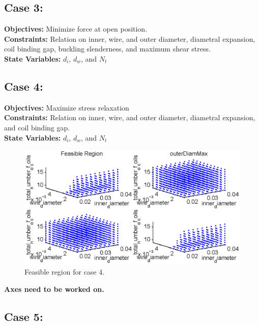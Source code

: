\documentclass[10pt]{article}
\begin{document}
\newpage
\subsection{Case 3:}
\label{sec:Case3}
	\textbf{Objectives:} Minimize force at open position.\\
	\textbf{Constraints:} Relation on inner, wire, and outer diameter, diametral expansion, coil binding gap, buckling slenderness, and maximum shear stress. \\
	\textbf{State Variables:} $d_{i}$, $d_{w}$, and $N_{t}$ \\

\newpage
\subsection{Case 4:}
\label{sec:Case4} 

	
	\textbf{Objectives:} Maximize stress relaxation\\
	\textbf{Constraints:} Relation on inner, wire, and outer diameter, diametral expansion, and coil binding gap. \\
	\textbf{State Variables:} $d_{i}$, $d_{w}$, and $N_{t}$ \\



		\begin{figure}[h]
		 \begin{center}\includegraphics[scale=.75]{Case_11_348.eps}\end{center}
		 \caption{Feasible region for case 4.}
		 \label{Feasible Case 4}
		 
		 \end{figure}
 		\textbf{Axes need to be worked on.}

\newpage
\subsection{Case 5:}
\label{sec:Case5}
\end{document}
